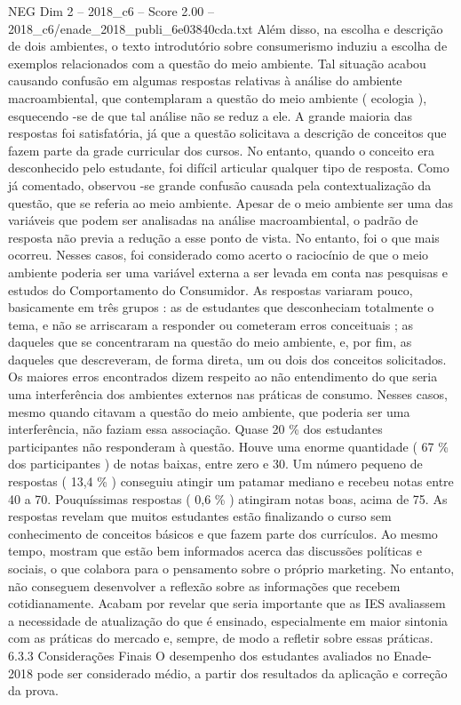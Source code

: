 \begin{textsample}{NEG Dim 2 – 2018\_c6 – Score 2.00 – 2018\_c6/enade\_2018\_publi\_6e03840cda.txt}
Além disso, na escolha e descrição de dois ambientes, o texto introdutório sobre consumerismo induziu a escolha de exemplos relacionados com a questão do meio ambiente.
Tal situação acabou causando confusão em algumas respostas relativas à análise do ambiente macroambiental, que contemplaram a questão do meio ambiente ( ecologia ), esquecendo -se de que tal análise não se reduz a ele.
A grande maioria das respostas foi satisfatória, já que a questão solicitava a descrição de conceitos que fazem parte da grade curricular dos cursos.
No entanto, quando o conceito era desconhecido pelo estudante, foi difícil articular qualquer tipo de resposta.
Como já comentado, observou -se grande confusão causada pela contextualização da questão, que se referia ao meio ambiente.
Apesar de o meio ambiente ser uma das variáveis que podem ser analisadas na análise macroambiental, o padrão de resposta não previa a redução a esse ponto de vista.
No entanto, foi o que mais ocorreu.
Nesses casos, foi considerado como acerto o raciocínio de que o meio ambiente poderia ser uma variável externa a ser levada em conta nas pesquisas e estudos do Comportamento do Consumidor.
As respostas variaram pouco, basicamente em três grupos : as de estudantes que desconheciam totalmente o tema, e não se arriscaram a responder ou cometeram erros conceituais ; as daqueles que se concentraram na questão do meio ambiente, e, por fim, as daqueles que descreveram, de forma direta, um ou dois dos conceitos solicitados.
Os maiores erros encontrados dizem respeito ao não entendimento do que seria uma interferência dos ambientes externos nas práticas de consumo.
Nesses casos, mesmo quando citavam a questão do meio ambiente, que poderia ser uma interferência, não faziam essa associação.
Quase 20 \% dos estudantes participantes não responderam à questão.
Houve uma enorme quantidade ( 67 \% dos participantes ) de notas baixas, entre zero e 30.
Um número pequeno de respostas ( 13,4 \% ) conseguiu atingir um patamar mediano e recebeu notas entre 40 a 70.
Pouquíssimas respostas ( 0,6 \% ) atingiram notas boas, acima de 75.
As respostas revelam que muitos estudantes estão finalizando o curso sem conhecimento de conceitos básicos e que fazem parte dos currículos.
Ao mesmo tempo, mostram que estão bem informados acerca das discussões políticas e sociais, o que colabora para o pensamento sobre o próprio marketing.
No entanto, não conseguem desenvolver a reflexão sobre as informações que recebem cotidianamente.
Acabam por revelar que seria importante que as IES avaliassem a necessidade de atualização do que é ensinado, especialmente em maior sintonia com as práticas do mercado e, sempre, de modo a refletir sobre essas práticas. 6.3.3 Considerações Finais O desempenho dos estudantes avaliados no Enade-2018 pode ser considerado médio, a partir dos resultados da aplicação e correção da prova.

\end{textsample}
